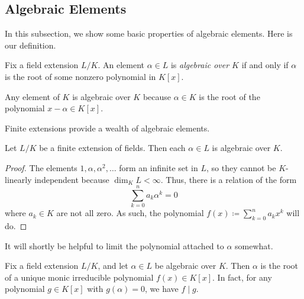 \documentclass[../notes.tex]{subfiles}
\begin{document}
\subsection{Algebraic Elements} \label{subsec:alg-elements}
In this subsection, we show some basic properties of algebraic elements. Here is our definition.
\begin{definition}[algebraic]
	Fix a field extension $L/K$. An element $\alpha\in L$ is \textit{algebraic over $K$} if and only if $\alpha$ is the root of some nonzero polynomial in $K[x]$.
\end{definition}
\begin{example}
	Any element of $K$ is algebraic over $K$ because $\alpha\in K$ is the root of the polynomial $x-\alpha\in K[x]$.
\end{example}
Finite extensions provide a wealth of algebraic elements.
\begin{lemma} \label{lem:finite-is-alg}
	Let $L/K$ be a finite extension of fields. Then each $\alpha\in L$ is algebraic over $K$.
\end{lemma}
\begin{proof}
	The elements $1,\alpha,\alpha^2,\ldots$ form an infinite set in $L$, so they cannot be $K$-linearly independent because $\dim_KL<\infty$. Thus, there is a relation of the form
	\[\sum_{k=0}^na_k\alpha^k=0\]
	where $a_k\in K$ are not all zero. As such, the polynomial $f(x)\coloneqq\sum_{k=0}^na_kx^k$ will do.
\end{proof}
It will shortly be helpful to limit the polynomial attached to $\alpha$ somewhat.
\begin{lemma} \label{lem:minimal-poly}
	Fix a field extension $L/K$, and let $\alpha\in L$ be algebraic over $K$. Then $\alpha$ is the root of a unique monic irreducible polynomial $f(x)\in K[x]$. In fact, for any polynomial $g\in K[x]$ with $g(\alpha)=0$, we have $f\mid g$.
\end{lemma}
\end{document}
